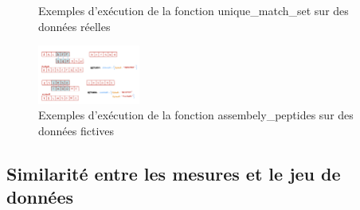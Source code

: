 \documentclass[titlepage]{report}
\begin{document}
\begin{figure}[H]
    \centering
    \qquad
    \caption{Exemples d'exécution de la fonction unique\_match\_set sur des données réelles}
    \label{}%
\end{figure}


\begin{figure}
\caption{Exemples d'exécution de la fonction assembely\_peptides sur des données fictives\vspace{1cm}}\label{}
\includegraphics[width=0.3\textwidth]{overlap_sch.jpg}
\end{figure}

\subsection{Similarité entre les mesures et le jeu de données}
\end{document}
